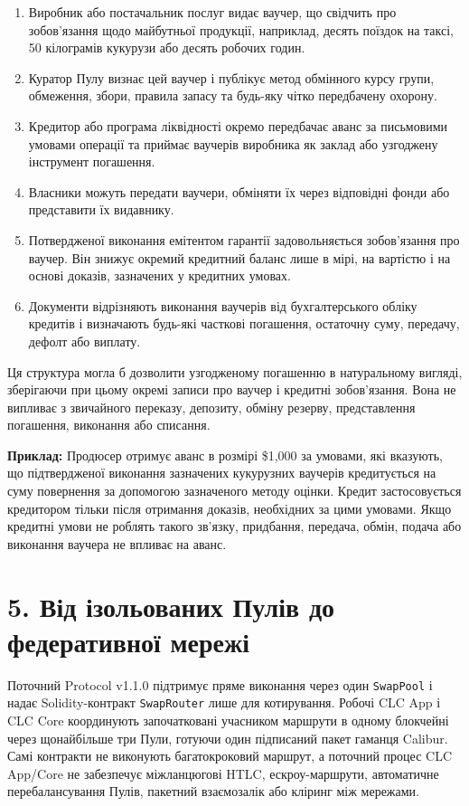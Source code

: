 \documentclass[11pt]{article}
\begin{document}
\begin{enumerate}[leftmargin=*]
\item Виробник або постачальник послуг видає ваучер, що свідчить про зобов'язання щодо майбутньої продукції, наприклад, десять поїздок на таксі, 50 кілограмів кукурузи або десять робочих годин.
\item Куратор Пулу визнає цей ваучер і публікує метод обмінного курсу групи, обмеження, збори, правила запасу та будь-яку чітко передбачену охорону.
\item Кредитор або програма ліквідності окремо передбачає аванс за письмовими умовами операції та приймає ваучерів виробника як заклад або узгоджену інструмент погашення.
\item Власники можуть передати ваучери, обміняти їх через відповідні фонди або представити їх видавнику.
\item Потвердженої виконання емітентом гарантії задовольняється зобов'язання про ваучер. Він знижує окремий кредитний баланс лише в мірі, на вартістю і на основі доказів, зазначених у кредитних умовах.
\item Документи відрізняють виконання ваучерів від бухгалтерського обліку кредитів і визначають будь-які часткові погашення, остаточну суму, передачу, дефолт або виплату.
\end{enumerate}
Ця структура могла б дозволити узгодженому погашенню в натуральному вигляді, зберігаючи при цьому окремі записи про ваучер і кредитні зобов'язання. Вона не випливає з звичайного переказу, депозиту, обміну резерву, представлення погашення, виконання або списання.

\textbf{Приклад:} Продюсер отримує аванс в розмірі \$1,000 за умовами, які вказують, що підтвердженої виконання зазначених кукурузних ваучерів кредитується на суму повернення за допомогою зазначеного методу оцінки. Кредит застосовується кредитором тільки після отримання доказів, необхідних за цими умовами. Якщо кредитні умови не роблять такого зв'язку, придбання, передача, обмін, подача або виконання ваучера не впливає на аванс.


\section*{5. Від ізольованих Пулів до федеративної мережі}

Поточний Protocol v1.1.0 підтримує пряме виконання через один \texttt{SwapPool} і надає Solidity-контракт \texttt{SwapRouter} лише для котирування. Робочі CLC App і CLC Core координують започатковані учасником маршрути в одному блокчейні через щонайбільше три Пули, готуючи один підписаний пакет гаманця Calibur. Самі контракти не виконують багатокроковий маршрут, а поточний процес CLC App/Core не забезпечує міжланцюгові HTLC, ескроу-маршрути, автоматичне перебалансування Пулів, пакетний взаємозалік або кліринг між мережами.
\end{document}

